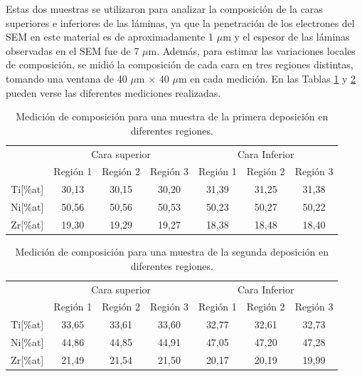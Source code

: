 \documentclass[12pt]{article}
\theoremstyle{definition}
\theoremstyle{remark}
\begin{document}
{Estas dos muestras se utilizaron para analizar la composición de la caras superiores e inferiores de las láminas, ya que la penetración de los electrones del SEM en este material es de aproximadamente 1 $\mu$m y el espesor de las láminas observadas en el SEM fue de 7 $\mu$m. Además, para estimar las variaciones locales de composición, se midió la composición de cada cara en tres regiones distintas, tomando una ventana de 40 $\mu$m $\times$ 40 $\mu$m en cada medición. En las Tablas \ref{composition2} y \ref{composition3} pueden verse las diferentes mediciones realizadas.


\begin{table}[H]
\begin{tabular}{c|c|c|c|c|c|c|}
\cline{2-7}
\multicolumn{1}{l|}{} & \multicolumn{3}{c|}{Cara superior} & \multicolumn{3}{c|}{Cara Inferior} \\ \cline{2-7} 
\multicolumn{1}{l|}{} & Región 1 & Región 2 & Región 3 & Región 1 & Región 2 & Región 3 \\ \hline
\multicolumn{1}{|c|}{Ti{[}\%at{]}} & 30,13 & 30,15 & 30,20 & 31,39 & 31,25 & 31,38 \\ \hline
\multicolumn{1}{|c|}{Ni{[}\%at{]}} & 50,56 & 50,56 & 50,53 & 50,23 & 50,27 & 50,22 \\ \hline
\multicolumn{1}{|c|}{Zr{[}\%at{]}} & 19,30 & 19,29 & 19,27 & 18,38 & 18,48 & 18,40 \\ \hline
\end{tabular}
\caption{Medición de composición para una muestra de la primera deposición en diferentes regiones.}
\label{composition2}
\end{table}

\begin{table}[H]
\begin{tabular}{c|c|c|c|c|c|c|}
\cline{2-7}
\multicolumn{1}{l|}{} & \multicolumn{3}{c|}{Cara superior} & \multicolumn{3}{c|}{Cara Inferior} \\ \cline{2-7} 
\multicolumn{1}{l|}{} & Región 1 & Región 2 & Región 3 & Región 1 & Región 2 & Región 3 \\ \hline
\multicolumn{1}{|c|}{Ti{[}\%at{]}} & 33,65 & 33,61 & 33,60 & 32,77 & 32,61 & 32,73 \\ \hline
\multicolumn{1}{|c|}{Ni{[}\%at{]}} & 44,86 & 44,85 & 44,91 & 47,05 & 47,20 & 47,28 \\ \hline
\multicolumn{1}{|c|}{Zr{[}\%at{]}} & 21,49 & 21,54 & 21,50 & 20,17 & 20,19 & 19,99 \\ \hline
\end{tabular}
\caption{Medición de composición para una muestra de la segunda deposición en diferentes regiones.}
\label{composition3}
\end{table}

}
\end{document}
